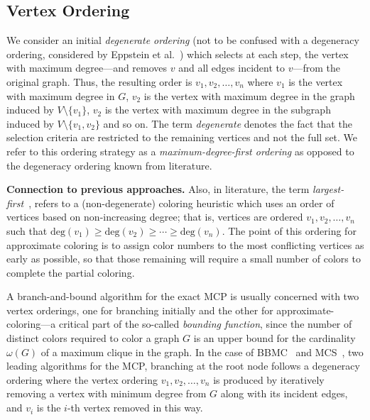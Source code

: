 \documentclass[final,1p]{elsarticle-modified}
\newcommand{\dd}{\ensuremath{\mathrm{deg}}}
\renewcommand{\paragraph}[1]{\medskip\noindent\textbf{#1.}}
\begin{document}
\subsection{Vertex Ordering}
\label{subsection:vertex-ordering}
We consider an initial \emph{degenerate ordering} (not to be confused with a degeneracy ordering, considered by Eppstein et al.~\cite{els-2013}) which selects at each step, the vertex  with maximum degree---and removes $v$ and all edges incident to $v$---from the original graph. Thus, the resulting order is $v_1,v_2,\ldots,v_n$ where $v_1$ is the vertex with maximum degree in $G$, $v_2$ is the vertex with maximum degree in the graph induced by $V\setminus \{v_1\}$, $v_2$ is the vertex with maximum degree in the subgraph induced by $V\setminus \{v_1, v_2\}$ and so on. The term \emph{degenerate} denotes the fact that the selection criteria are restricted to the remaining vertices and not the full set. We refer to this ordering strategy as a \emph{maximum-degree-first ordering} as opposed to the degeneracy ordering known from literature.



\paragraph{Connection to previous approaches}
Also, in literature, the term \emph{largest-first}~\cite{freuder-1982,welsh-1967}, refers to a (non-degenerate) coloring heuristic which uses an order of vertices based on non-increasing degree; that is, vertices are ordered $v_1,v_2,\ldots,v_n$ such that $\dd(v_1)\geq \dd(v_2)\geq \cdots \geq \dd(v_n)$. The point of this ordering for approximate coloring is to assign color numbers to the most conflicting vertices as early as possible, so that those remaining will require a small number of colors to complete the partial coloring. 

A branch-and-bound algorithm for the exact MCP is usually concerned with two vertex orderings, one for branching initially and the other for approximate-coloring---a critical part of the so-called \emph{bounding function}, since the number of distinct colors required to color a graph $G$ is an upper bound for the cardinality $\omega(G)$ of a maximum clique in the graph. In the case of BBMC~\cite{segundo-bitboard-2011,segundo-recoloring} and MCS~\cite{tomita-recoloring}, two leading algorithms for the MCP, branching at the root node follows a degeneracy ordering where the vertex ordering $v_1,v_2,\ldots,v_n$ is produced by iteratively removing a vertex with minimum degree from $G$ along with its incident edges, and $v_i$ is the $i$-th vertex removed in this way.
\end{document}
